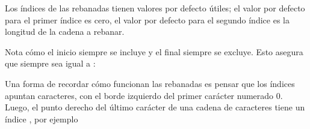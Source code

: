 \documentclass[a4,10pt,spanish]{sphinxmanual}
\begin{document}
\sphinxAtStartPar
Los índices de las rebanadas tienen valores por defecto útiles; el valor por defecto para el primer índice es cero, el valor por defecto para el segundo índice es la longitud de la cadena a rebanar.

\begin{sphinxVerbatim}[commandchars=\\\{\}]
\PYG{p}{[}\PYG{p}{]}   
\PYG{p}{[}\PYG{p}{]}   
\PYG{p}{[}\PYG{p}{]}  
\end{sphinxVerbatim}

\sphinxAtStartPar
Nota cómo el inicio siempre se incluye y el final siempre se excluye. Esto asegura que  siempre sea igual a :

\begin{sphinxVerbatim}[commandchars=\\\{\}]
\PYG{p}{[}\PYG{p}{]}  \PYG{p}{[}\PYG{p}{]}
\PYG{p}{[}\PYG{p}{]}  \PYG{p}{[}\PYG{p}{]}
\end{sphinxVerbatim}

\sphinxAtStartPar
Una forma de recordar cómo funcionan las rebanadas es pensar que los índices apuntan  caracteres, con el borde izquierdo del primer carácter numerado 0. Luego, el punto derecho del último carácter de una cadena de  caracteres tiene un índice , por ejemplo
\end{document}
